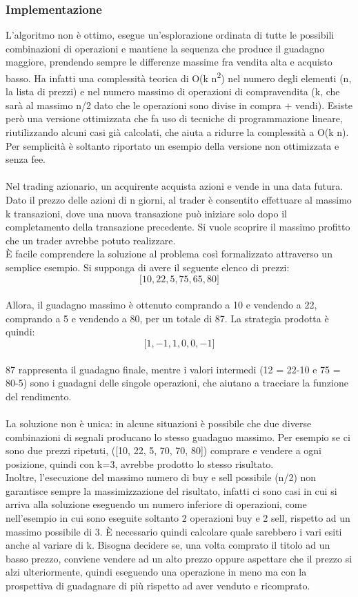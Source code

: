 \documentclass[a4paper,12pt]{report}
\begin{document}
\begin{fig}
\subsubsection{Implementazione}
L'algoritmo non è ottimo, esegue un'esplorazione ordinata di tutte le possibili combinazioni di operazioni e mantiene la sequenza che produce il guadagno maggiore, prendendo sempre le differenze massime fra vendita alta e acquisto basso. Ha infatti una complessità teorica di O(k n\textsuperscript{2}) nel numero degli elementi (n, la lista di prezzi) e nel numero massimo di operazioni di compravendita (k, che sarà al massimo n/2 dato che le operazioni sono divise in compra + vendi). Esiste però una versione ottimizzata che fa uso di tecniche di programmazione lineare, riutilizzando alcuni casi già calcolati, che aiuta a ridurre la complessità a O(k n). Per semplicità è soltanto riportato un esempio della versione non ottimizzata e senza fee.\\~\\Nel trading azionario, un acquirente acquista azioni e vende in una data futura. Dato il prezzo delle azioni di n giorni, al trader è consentito effettuare al massimo k transazioni, dove una nuova transazione può iniziare solo dopo il completamento della transazione precedente. Si vuole scoprire il massimo profitto che un trader avrebbe potuto realizzare.\\ È facile comprendere la soluzione al problema così formalizzato attraverso un semplice esempio. Si supponga di avere il seguente elenco di prezzi:\\ \[\big[ 10, 22, 5, 75, 65, 80 \big]\]\\ Allora, il guadagno massimo è ottenuto comprando a 10 e vendendo a 22, comprando a 5 e vendendo a 80, per un totale di 87. La strategia prodotta è quindi:\\ \[\big[ 1, -1, 1, 0, 0, -1 \big]\]\\87 rappresenta il guadagno finale, mentre i valori intermedi (12 = 22-10 e 75 = 80-5) sono i guadagni delle singole operazioni, che aiutano a tracciare la funzione del rendimento.\\~\\
La soluzione non è unica: in alcune situazioni è possibile che due diverse combinazioni di segnali producano lo stesso guadagno massimo. Per esempio se ci sono due prezzi ripetuti, ([10, 22, 5, 70, 70, 80]) comprare e vendere a ogni posizione, quindi con k=3, avrebbe prodotto lo stesso risultato.\\
Inoltre, l'esecuzione del massimo numero di buy e sell possibile (n/2) non garantisce sempre la massimizzazione del risultato, infatti ci sono casi in cui si arriva alla soluzione eseguendo un numero inferiore di operazioni, come nell'esempio in cui sono eseguite soltanto 2 operazioni buy e 2 sell, rispetto ad un massimo possibile di 3. È necessario quindi calcolare quale sarebbero i vari esiti anche al variare di k. Bisogna decidere se, una volta comprato il titolo ad un basso prezzo, conviene vendere ad un alto prezzo oppure aspettare che il prezzo si alzi ulteriormente, quindi eseguendo una operazione in meno ma con la prospettiva di guadagnare di più rispetto ad aver venduto e ricomprato.\\~\\

\end{fig}
\end{document}
